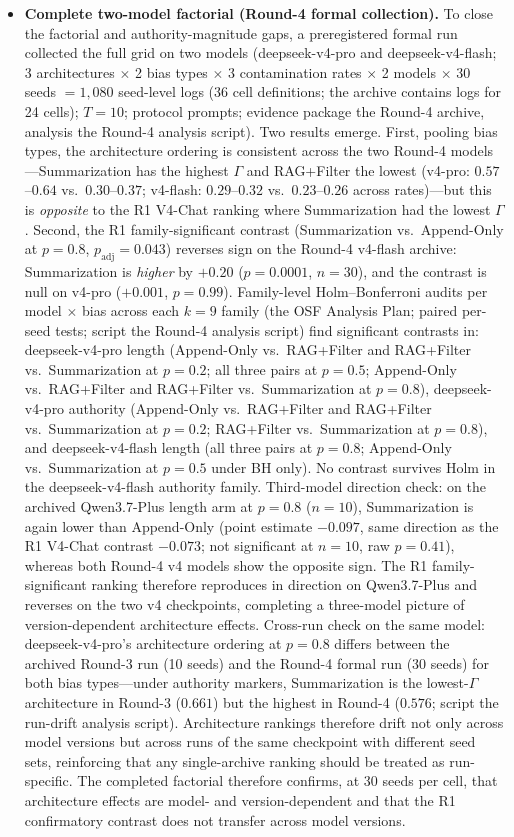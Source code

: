 \documentclass[11pt]{article}
\begin{document}
\begin{itemize}[nosep]
    \item \textbf{Complete two-model factorial (Round-4 formal collection).} To close the factorial and authority-magnitude gaps, a preregistered formal run collected the full grid on two models (deepseek-v4-pro and deepseek-v4-flash; 3 architectures $\times$ 2 bias types $\times$ 3 contamination rates $\times$ 2 models $\times$ 30 seeds $= 1{,}080$ seed-level logs (36 cell definitions; the archive contains logs for 24 cells); $T{=}10$; protocol prompts; evidence package the Round-4 archive, analysis the Round-4 analysis script). Two results emerge. First, pooling bias types, the architecture ordering is consistent across the two Round-4 models---Summarization has the highest $\Gamma$ and RAG+Filter the lowest (v4-pro: $0.57$--$0.64$ vs.\ $0.30$--$0.37$; v4-flash: $0.29$--$0.32$ vs.\ $0.23$--$0.26$ across rates)---but this is \emph{opposite} to the R1 V4-Chat ranking where Summarization had the lowest $\Gamma$. Second, the R1 family-significant contrast (Summarization vs.\ Append-Only at $p{=}0.8$, $p_{\text{adj}}{=}0.043$) reverses sign on the Round-4 v4-flash archive: Summarization is \emph{higher} by $+0.20$ ($p{=}0.0001$, $n{=}30$), and the contrast is null on v4-pro ($+0.001$, $p{=}0.99$). Family-level Holm--Bonferroni audits per model $\times$ bias across each $k{=}9$ family (the OSF Analysis Plan; paired per-seed tests; script the Round-4 analysis script) find significant contrasts in: deepseek-v4-pro length (Append-Only vs.\ RAG+Filter and RAG+Filter vs.\ Summarization at $p{=}0.2$; all three pairs at $p{=}0.5$; Append-Only vs.\ RAG+Filter and RAG+Filter vs.\ Summarization at $p{=}0.8$), deepseek-v4-pro authority (Append-Only vs.\ RAG+Filter and RAG+Filter vs.\ Summarization at $p{=}0.2$; RAG+Filter vs.\ Summarization at $p{=}0.8$), and deepseek-v4-flash length (all three pairs at $p{=}0.8$; Append-Only vs.\ Summarization at $p{=}0.5$ under BH only). No contrast survives Holm in the deepseek-v4-flash authority family. Third-model direction check: on the archived Qwen3.7-Plus length arm at $p{=}0.8$ ($n{=}10$), Summarization is again lower than Append-Only (point estimate $-0.097$, same direction as the R1 V4-Chat contrast $-0.073$; not significant at $n{=}10$, raw $p{=}0.41$), whereas both Round-4 v4 models show the opposite sign. The R1 family-significant ranking therefore reproduces in direction on Qwen3.7-Plus and reverses on the two v4 checkpoints, completing a three-model picture of version-dependent architecture effects. Cross-run check on the same model: deepseek-v4-pro's architecture ordering at $p{=}0.8$ differs between the archived Round-3 run (10 seeds) and the Round-4 formal run (30 seeds) for both bias types---under authority markers, Summarization is the lowest-$\Gamma$ architecture in Round-3 ($0.661$) but the highest in Round-4 ($0.576$; script the run-drift analysis script). Architecture rankings therefore drift not only across model versions but across runs of the same checkpoint with different seed sets, reinforcing that any single-archive ranking should be treated as run-specific. The completed factorial therefore confirms, at 30 seeds per cell, that architecture effects are model- and version-dependent and that the R1 confirmatory contrast does not transfer across model versions.


\end{itemize}
\end{document}
